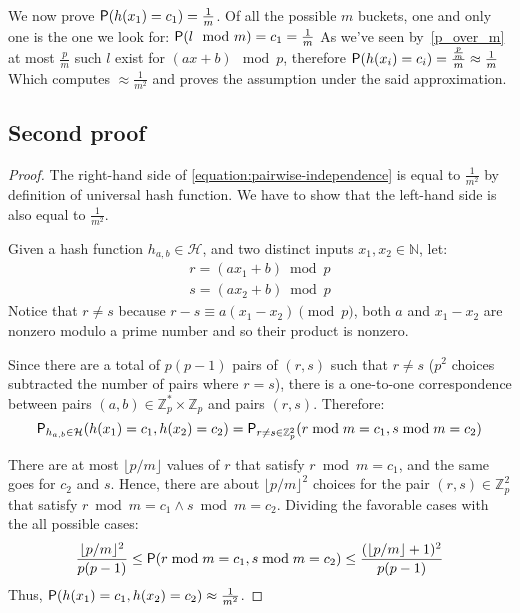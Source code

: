 We now prove $\mathsf{P}(h(x_{1}) = c_{1}) = \frac{1}{m}$.
Of all the possible $m$ buckets, one and only one is the one we look for:
$\mathsf{P}(l \mod m) = c_{1} = \frac{1}{m}$
As we've seen by~\ref{p_over_m} at most $\frac{p}{m}$ such $l$ exist for $(a x + b) \mod p$,
therefore $\mathsf{P}(h(x_i) = c_{i}) = \frac{\frac{p}{m}}{m} \approx \frac{1}{m}$
Which computes $\approx \frac{1}{m^{2}}$ and proves the assumption under the said approximation.

\subsection{Second proof}

\begin{proof}
The right-hand side of \eqref{equation:pairwise-independence} is equal to $\frac{1}{m^2}$ by definition of universal hash function. We have to show that the left-hand side is also equal to  $\frac{1}{m^2}$.

Given a hash function $h_{a,b} \in \mathcal{H}$, and two distinct inputs $x_1, x_2 \in \mathbb{N}$, let:
\begin{align*}
  r = (a x_1 + b) \bmod p\\
  s = (a x_2 + b) \bmod p
\end{align*}
Notice that $r \ne s$ because $r - s \equiv a(x_1-x_2) \pmod p $,  both $a$ and $x_1-x_2$ are nonzero modulo a prime number and so their product is nonzero.

Since there are a total of $p(p-1)$ pairs of $(r, s)$ such that $r \ne s$ ($p^2$ choices subtracted the number of pairs where $r=s$), there is a one-to-one correspondence between pairs $(a, b)\in \mathbb{Z}_p^*\times\mathbb{Z}_p$ and pairs $(r, s)$. Therefore:
$$\mathsf{P}_{h_{a,b}\in\mathcal{H}}(h(x_1)= c_1, h(x_2) = c_2) = \mathsf{P}_{r\ne s\in\mathbb{Z}_p^2}(r \bmod m = c_1, s \bmod m = c_2)$$

There are at most $\lfloor p / m \rfloor $ values of $r$ that satisfy $r \bmod m=c_1$, and the same goes for $c_2$ and $s$. Hence, there are about $\lfloor p / m \rfloor^2$ choices for the pair $(r, s) \in \mathbb{Z}_p^2$ that satisfy $r \bmod m = c_1 \wedge s \bmod m = c_2$. Dividing the favorable cases with the all possible cases:
$$\frac{\lfloor p / m \rfloor^2}{p(p-1)}\le\mathsf{P}(r \bmod m = c_1, s \bmod m = c_2)\le \frac{(\lfloor p / m \rfloor + 1)^2}{p(p-1)}$$
Thus, $\mathsf{P}(h(x_1)= c_1, h(x_2) = c_2)\approx \frac{1}{m^2}$.

\end{proof}